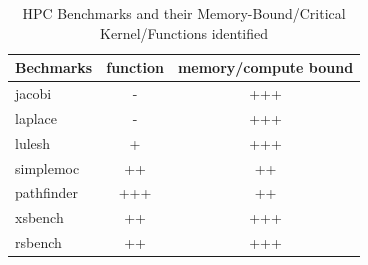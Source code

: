 %
%
\begin{table}[t!]
\small
\caption{HPC Benchmarks and their Memory-Bound/Critical Kernel/Functions identified}
\centering
    \begin{tabularx}{7.2cm}{lcc}
\toprule
    Bechmarks & function & memory/compute bound \\
\midrule
jacobi & - & +++ \\
laplace  & - & +++ \\
lulesh & + & +++ \\
simplemoc & ++ & ++ \\
pathfinder   & +++ & ++ \\
xsbench      & ++ & +++ \\
rsbench      & ++ & +++ \\
\bottomrule
   \end{tabularx}
\label{table:compare}
\end{table}
%
%
%










